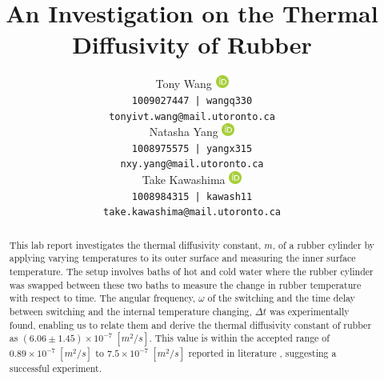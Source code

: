 \documentclass[12pt]{article}
\title{An Investigation on the Thermal Diffusivity of Rubber}
\author{
Tony Wang \href{https://orcid.org/0009-0009-3015-7192}{\includegraphics[height=12pt]{figure/orcid.png}}\\
\texttt{1009027447 | wangq330} \\
\texttt{tonyivt.wang@mail.utoronto.ca}\\
\And
Natasha Yang \href{https://orcid.org/12345}{\includegraphics[height=12pt]{figure/orcid.png}}\\
\texttt{1008975575 | yangx315} \\
\texttt{nxy.yang@mail.utoronto.ca} \\
\And
Take Kawashima 
{\includegraphics[height=12pt]{figure/orcid.png}}\\
\texttt{1008984315 | kawash11} \\
\texttt{take.kawashima@mail.utoronto.ca} \\
}
\begin{document}
\maketitle
\begin{abstract}
    This lab report investigates the thermal diffusivity constant, $m$, of a rubber cylinder by applying varying temperatures to its outer surface and measuring the inner surface temperature. The setup involves baths of hot and cold water where the rubber cylinder was swapped between these two baths to measure the change in rubber temperature with respect to time. The angular frequency, $\omega$ of the switching and the time delay between switching and the internal temperature changing, $\Delta t$ was experimentally found, enabling us to relate them and derive the thermal diffusivity constant of rubber as $(6.06 \pm 1.45) \times 10^{-7}\; [m^{2}/s]$. This value is within the accepted range of $0.89\times 10^{-7} \; [m^{2}/s]$ to $ 7.5\times 10^{-7}\; [m^{2}/s]$ reported in literature \autocite{article}, suggesting a successful experiment.
\end{abstract}

\end{document}
